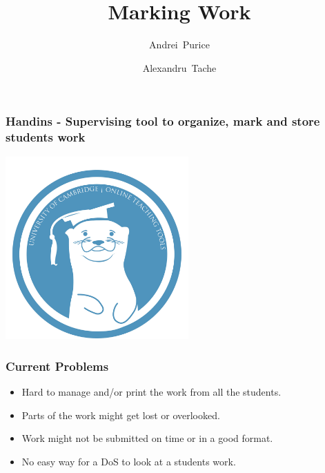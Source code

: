 \documentclass{beamer}
\title %
{Marking Work}
\author[Author, Anders] %
{Andrei~Purice \and Alexandru~Tache}
\begin{document}
	\begin{frame}
		\frametitle{Handins - Supervising tool to organize, mark and store students work}
		\begin{center}	
		 \includegraphics[height=7cm]{otter.jpg}
		\end{center}
    \end{frame}
	\begin{frame}
    	\frametitle{Current Problems}
 
   	   	\begin{itemize}
   	   		\item Hard to manage and/or print the work from all the students. 
   	   		\item Parts of the work might get lost or overlooked.
   	   		\item Work might not be submitted on time or in a good format.
   	   		\item No easy way for a DoS to look at a students work.
  	   	 \end{itemize}	   	 
  	\end{frame}
  	
\end{document}
